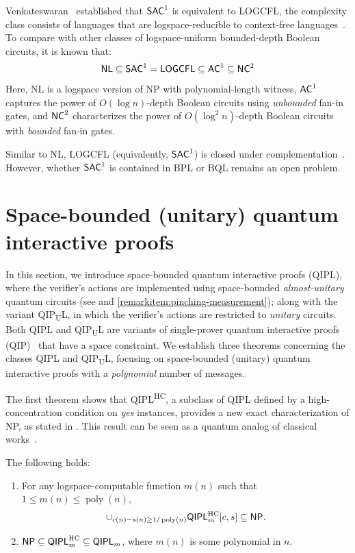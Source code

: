 \documentclass[10pt,a4paper]{article}
\numberwithin{equation}{section}
\numberwithin{figure}{section}
\newcommand{\NP}{\textnormal{\textsf{NP}}\xspace}
\newcommand{\QIP}{\textnormal{\textsf{QIP}}\xspace}
\newcommand{\QIPL}{\textnormal{\textsf{QIPL}}\xspace}
\newcommand{\QIPUL}{\texorpdfstring{\textnormal{\textsf{QIP}\textsubscript{\textnormal{U}}\textsf{L}}}\xspace}
\newcommand{\QIPLHC}{\texorpdfstring{\textnormal{\textsf{QIPL}\textsuperscript{\textnormal{HC}}}}\xspace}
\newcommand{\HC}{\mathrm{HC}}
\newcommand{\BPL}{\textnormal{\textsf{BPL}}\xspace}
\newcommand{\BQL}{\textnormal{\textsf{BQL}}\xspace}
\newcommand{\SAC}{\textnormal{\textsf{SAC}}\xspace}
\newcommand{\AC}{\textnormal{\textsf{AC}}\xspace}
\newcommand{\NC}{\textnormal{\textsf{NC}}\xspace}
\newcommand{\NL}{\textnormal{\textsf{NL}}\xspace}
\newcommand{\LOGCFL}{\textnormal{\textsf{LOGCFL}}\xspace}
\DeclareMathOperator\poly{poly}
\begin{document}
Venkateswaran~\cite{Venkateswaran87} established that $\SAC^1$ is equivalent to \LOGCFL{}, the complexity class consists of languages that are logspace-reducible to context-free languages~\cite{Sudborough78}. 
To compare with other classes of logspace-uniform bounded-depth Boolean circuits, it is known that:
\[\NL \subseteq \SAC^1 = \LOGCFL \subseteq \AC^1 \subseteq \NC^2\] 
Here, \NL{} is a logspace version of \NP{} with polynomial-length witness, $\AC^1$ captures the power of $O(\log{n})$-depth Boolean circuits using \textit{unbounded} fan-in gates, and $\NC^2$ characterizes the power of $O(\log^2{n})$-depth Boolean circuits with \textit{bounded} fan-in gates. 

Similar to \NL{}, \LOGCFL{} (equivalently, $\SAC^1$) is closed under complementation~\cite{BCD+89}. However, whether $\SAC^1$ is contained in \BPL{} or \BQL{} remains an open problem. 

\section{Space-bounded (unitary) quantum interactive proofs}
\label{sec:poly-message-QIPL}

In this section, we introduce space-bounded quantum interactive proofs (\QIPL{}), where the verifier's actions are implemented using space-bounded \textit{almost-unitary} quantum circuits (see  and \ref{remarkitem:pinching-measurement}); along with the variant \QIPUL{}, in which the verifier's actions are restricted to \textit{unitary} circuits. Both \QIPL{} and \QIPUL{} are variants of single-prover quantum interactive proofs (\QIP{})~\cite{Wat99QIP,KW00} that have a space constraint. We establish three theorems concerning the classes \QIPL{} and \QIPUL{}, focusing on space-bounded (unitary) quantum interactive proofs with a \textit{polynomial} number of messages. 

The first theorem shows that \QIPLHC{}, a subclass of \QIPL{} defined by a high-concentration condition on \textit{yes} instances, provides a new exact characterization of \NP{}, as stated in . 
This result can be seen as a quantum analog of classical works~\cite{Lipton90,CL95}. 


\begin{theorem}[The equivalence of \QIPLHC{} and \NP]
    \label{thm:QIPL-eq-NP}
    The following holds: 
    \begin{enumerate}[label={\upshape(\arabic*)}, topsep=0.33em, itemsep=0.33em, parsep=0.33em]
        \item For any logspace-computable function $m(n)$ such that $1 \leq m(n) \leq \poly(n)$,  
        \[\cup_{c(n)-s(n) \geq 1/\poly(n)}\QIPL^\HC_m[c,s] \subseteq \NP.\]
        \label{thmitem:QIPLHC-in-NP}
        \item $\NP \subseteq \QIPL^\HC_m \subseteq \QIPL_m$, where $m(n)$ is some polynomial in $n$.
    \end{enumerate}
\end{theorem}
\end{document}
